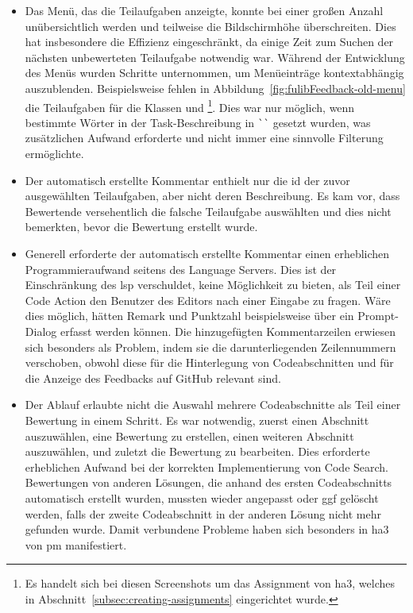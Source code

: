 \begin{itemize}
    \item Das Menü, das die Teilaufgaben anzeigte, konnte bei einer großen Anzahl unübersichtlich werden und teilweise die Bildschirmhöhe überschreiten.
    Dies hat insbesondere die Effizienz eingeschränkt, da einige Zeit zum Suchen der nächsten unbewerteten Teilaufgabe notwendig war.
    Während der Entwicklung des Menüs wurden Schritte unternommen, um Menüeinträge kontextabhängig auszublenden.
    Beispielsweise fehlen in Abbildung~\ref{fig:fulibFeedback-old-menu} die Teilaufgaben für die Klassen  und \footnote{
        Es handelt sich bei diesen Screenshots um das Assignment von \ac{ha}3, welches in Abschnitt~\ref{subsec:creating-assignments} eingerichtet wurde.
    }.
    Dies war nur möglich, wenn bestimmte Wörter in der Task-Beschreibung in \verb|``| gesetzt wurden, was zusätzlichen Aufwand erforderte und nicht immer eine sinnvolle Filterung ermöglichte.
    \item Der automatisch erstellte Kommentar enthielt nur die \ac{id} der zuvor ausgewählten Teilaufgaben, aber nicht deren Beschreibung.
    Es kam vor, dass Bewertende versehentlich die falsche Teilaufgabe auswählten und dies nicht bemerkten, bevor die Bewertung erstellt wurde.
    \item Generell erforderte der automatisch erstellte Kommentar einen erheblichen Programmieraufwand seitens des Language Servers.
    Dies ist der Einschränkung des \ac{lsp} verschuldet, keine Möglichkeit zu bieten, als Teil einer Code Action den Benutzer des Editors nach einer Eingabe zu fragen.
    Wäre dies möglich, hätten Remark und Punktzahl beispielsweise über ein Prompt-Dialog erfasst werden können.
    Die hinzugefügten Kommentarzeilen erwiesen sich besonders als Problem, indem sie die darunterliegenden Zeilennummern verschoben, obwohl diese für die Hinterlegung von Codeabschnitten und für die Anzeige des Feedbacks auf GitHub relevant sind.
    \item Der Ablauf erlaubte nicht die Auswahl mehrere Codeabschnitte als Teil einer Bewertung in einem Schritt.
    Es war notwendig, zuerst einen Abschnitt auszuwählen, eine Bewertung zu erstellen, einen weiteren Abschnitt auszuwählen, und zuletzt die Bewertung zu bearbeiten.
    Dies erforderte erheblichen Aufwand bei der korrekten Implementierung von Code Search.
    Bewertungen von anderen Lösungen, die anhand des ersten Codeabschnitts automatisch erstellt wurden, mussten wieder angepasst oder \ac{ggf} gelöscht werden, falls der zweite Codeabschnitt in der anderen Lösung nicht mehr gefunden wurde.
    Damit verbundene Probleme haben sich besonders in \ac{ha}3 von \ac{pm} manifestiert.
\end{itemize}


